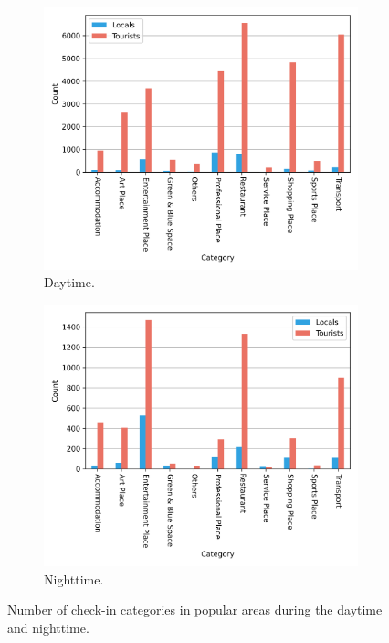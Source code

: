\documentclass{article}
\theoremstyle{remark}
\begin{document}
\begin{figure}[!h]

\begin{subfigure}{0.5\textwidth}
\includegraphics[width=1\linewidth]{figures/diff_pop_category_daytime.png} 
\caption{Daytime.}
\label{fig:diff_pop_category_daytime}
\end{subfigure}
\begin{subfigure}{0.5\textwidth}
\includegraphics[width=1\linewidth]{figures/diff_pop_category_nighttime.png}
\caption{Nighttime.}
\label{fig:diff_pop_category_nighttime}
\end{subfigure}

\caption{Number of check-in categories in popular areas during the daytime and nighttime.} \label{fig:diff_pop_category_day}
\end{figure}
\end{document}
